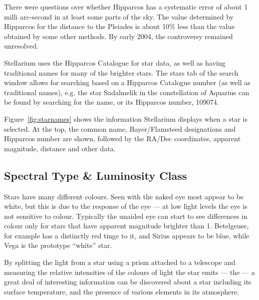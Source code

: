 There were questions over whether Hipparcos has a systematic error of
about 1 milli arc-second in at least some parts of the sky. The value
determined by Hipparcos for the distance to the Pleiades is about 10\%
less than the value obtained by some other methods. By early 2004, the
controversy remained unresolved.

Stellarium uses the Hipparcos Catalogue for star data, as well as having
traditional names for many of the brighter stars. The stars tab of the
search window allows for searching based on a Hipparcos Catalogue number
(as well as traditional names), e.g. the star Sadalmelik in the
constellation of Aquarius can be found by searching for the name, or
its Hipparcos number, 109074.

%
%

Figure~\ref{fig:starnames} shows the information
Stellarium displays when a star is selected. At the top, the common
name, Bayer/Flamsteed designations and Hipparcos number are shown,
followed by the RA/Dec coordinates, apparent magnitude, distance and
other data.

\subsection{Spectral Type \& Luminosity Class}
\label{sec:Phenomena:SpectralTypeLuminosityClass}

Stars have many different colours. Seen with the naked eye most appear
to be white, but this is due to the response of the eye --- at low
light levels the eye is not sensitive to colour. Typically the unaided
eye can start to see differences in colour only for stars that have
apparent magnitude brighter than 1. Betelgeuse, for example has a
distinctly red tinge to it, and Sirius appears to be blue, while Vega
is the prototype ``white'' star.

By splitting the light from a star using a prism attached to a telescope
and measuring the relative intensities of the colours of light the star
emits --- the  --- a great deal of interesting information
can be discovered about a star including its surface temperature, and
the presence of various elements in its atmosphere.

